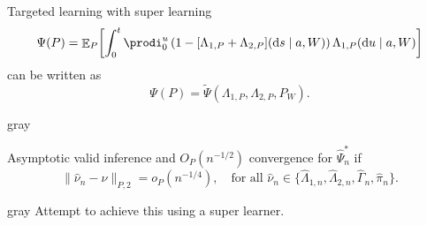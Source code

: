 \documentclass[smaller]{beamer}\usepackage{listings}
\newcommand{\E}{{\ensuremath{\mathop{{\mathbb{E}}}}}}
\newcommand*\diff{\mathop{}\!\mathrm{d}}
\newcommand\smallO{\textit{o}}
\newcommand\bigO{\textit{O}}
\newcommand{\1}{\mathds{1}}
\newcommand{\empmeas}{\ensuremath{\mathbb{P}_n}} %
\begin{document}
\begin{frame}[label={sec:orgdd198a9}]{Targeted learning with super learning}
\begin{equation*}
  \Psi(P) =
  \E_{P}{
          \left[
            \int_0^t
            \prodi_0^u\left( 1 -
              [\Lambda_{1,P}+\Lambda_{2,P}](\diff s \mid a, W) \right)
            \Lambda_{1,P}(\diff u \mid a, W)
          \right]}
\end{equation*}
can be written as
\begin{equation*}
  \Psi(P) = \tilde{\Psi}(\Lambda_{1,P}, \Lambda_{2,P}, P_W).
\end{equation*}

\vfill

\begin{beamercolorbox}[rounded=true]{gray}
\begin{center}
\end{center}
\end{beamercolorbox}

\begin{block}{}
\vspace{-.2cm}

Asymptotic valid inference and \(\bigO_P(n^{-1/2})\) convergence
for \(\hat{\Psi}_n^*\) if
\begin{equation*}
  \| \hat{\nu}_n - \nu \|_{P,2} = \smallO_P{(n^{-1/4})},
  \quad \text{for all } \hat{\nu}_n \in
  \{ \hat{\Lambda}_{1,n}, \hat{\Lambda}_{2,n}, \hat{\Gamma}_n,
  \hat{\pi}_n \}.
\end{equation*}

\pause
\end{block}

\begin{beamercolorbox}[rounded=true]{gray}
\centering Attempt to achieve this using a super learner.
\end{beamercolorbox}
\end{frame}
\end{document}
